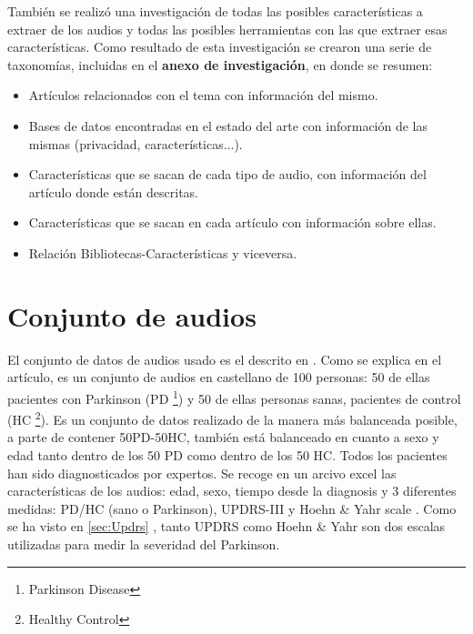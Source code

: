 También se realizó una investigación de todas las posibles características a extraer de los audios y todas las posibles herramientas con las que extraer esas características. Como resultado de esta investigación se crearon una serie de taxonomías, incluidas en el \textbf{anexo de investigación}, en donde se resumen:
\begin{itemize}
\item Artículos relacionados con el tema con información del mismo.
\item Bases de datos encontradas en el estado del arte con información de las mismas (privacidad, características...).
\item Características que se sacan de cada tipo de audio, con información del artículo donde están descritas.
\item Características que se sacan en cada artículo con información sobre ellas.
\item Relación Bibliotecas-Características y viceversa.
\end{itemize}


\section{Conjunto de audios}
El conjunto de datos de audios usado es el descrito en \cite{OrzCorpus}. Como se explica en el artículo, es un conjunto de audios en castellano de 100 personas: 50 de ellas pacientes con Parkinson (PD \footnote{Parkinson Disease}) y 50 de ellas personas sanas, pacientes de control (HC \footnote{Healthy Control}). Es un conjunto de datos realizado de la manera más balanceada posible, a parte de contener 50PD-50HC, también está balanceado en cuanto a sexo y edad tanto dentro de los 50 PD como dentro de los 50 HC. Todos los pacientes han sido diagnosticados por expertos. Se recoge en un arcivo excel las características de los audios: edad, sexo, tiempo desde la diagnosis y 3 diferentes medidas: PD/HC (sano o Parkinson), UPDRS-III \cite{updrs} y  Hoehn \& Yahr scale \cite{hoehn1967}. Como se ha visto en \ref{sec:Updrs} , tanto UPDRS como Hoehn \& Yahr son dos escalas utilizadas para medir la severidad del Parkinson.

